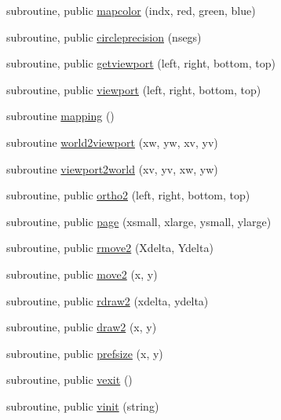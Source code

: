\begin{DoxyCompactItemize}
\item 
subroutine, public \mbox{\hyperlink{namespacem__pixel_a3422f51171f30979868a8075690da9f5}{mapcolor}} (indx, red, green, blue)
\item 
subroutine, public \mbox{\hyperlink{namespacem__pixel_a68ca1be8f7a92ece6efce8d69987af9c}{circleprecision}} (nsegs)
\item 
subroutine, public \mbox{\hyperlink{namespacem__pixel_a9f382cf8d3b69e11d1fdd2f2a4f59dea}{getviewport}} (left, right, bottom, top)
\item 
subroutine, public \mbox{\hyperlink{namespacem__pixel_a43247343cd316e3aa075b44b5166e2e9}{viewport}} (left, right, bottom, top)
\item 
subroutine \mbox{\hyperlink{namespacem__pixel_a84c841de62fc0addddeff305c4ede9d4}{mapping}} ()
\item 
subroutine \mbox{\hyperlink{namespacem__pixel_a9d4aea8ae2eb15317b83fa03a11371b2}{world2viewport}} (xw, yw, xv, yv)
\item 
subroutine \mbox{\hyperlink{namespacem__pixel_a9e23c9a3a5f3b1482986f067fbf8487f}{viewport2world}} (xv, yv, xw, yw)
\item 
subroutine, public \mbox{\hyperlink{namespacem__pixel_a80dece6adac704024a5a76efee697770}{ortho2}} (left, right, bottom, top)
\item 
subroutine, public \mbox{\hyperlink{namespacem__pixel_a6733a8657ca9f51b2648690dbae258c9}{page}} (xsmall, xlarge, ysmall, ylarge)
\item 
subroutine, public \mbox{\hyperlink{namespacem__pixel_a9b0fb9ccafe605fd6daf50c74347ed3a}{rmove2}} (Xdelta, Ydelta)
\item 
subroutine, public \mbox{\hyperlink{namespacem__pixel_ab5d4dc474ff84dc0f3f35f4a395979e0}{move2}} (x, y)
\item 
subroutine, public \mbox{\hyperlink{namespacem__pixel_a664375b036092dbebe1bccdc67254e1d}{rdraw2}} (xdelta, ydelta)
\item 
subroutine, public \mbox{\hyperlink{namespacem__pixel_a12012e819bb14b27d2b49732aa2e4e55}{draw2}} (x, y)
\item 
subroutine, public \mbox{\hyperlink{namespacem__pixel_acc868686f05b7e0b3cd33bf9d1c6bb98}{prefsize}} (x, y)
\item 
subroutine, public \mbox{\hyperlink{namespacem__pixel_a19ad6b65752322b0029a62cc0ebec3e8}{vexit}} ()
\item 
subroutine, public \mbox{\hyperlink{namespacem__pixel_ac03ca8f23fdadb60599b6ea4dc87a6d9}{vinit}} (string)
\item 

\end{DoxyCompactItemize}
